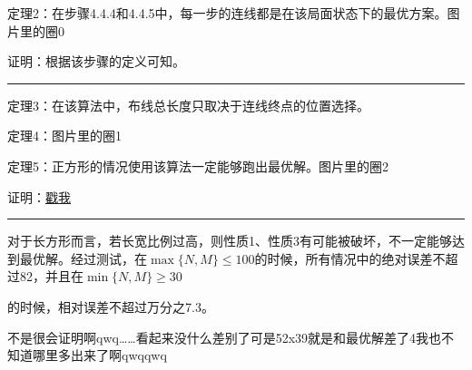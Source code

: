\documentclass[]{article}
\begin{document}
定理2：在步骤4.4.4和4.4.5中，每一步的连线都是在该局面状态下的最优方案。图片里的圈0

证明：根据该步骤的定义可知。

\begin{center}\rule{0.5\linewidth}{\linethickness}\end{center}

定理3：在该算法中，布线总长度只取决于连线终点的位置选择。

定理4：图片里的圈1

定理5：正方形的情况使用该算法一定能够跑出最优解。图片里的圈2

证明：\href{proof.jpg}{戳我}

\begin{center}\rule{0.5\linewidth}{\linethickness}\end{center}

对于长方形而言，若长宽比例过高，则性质1、性质3有可能被破坏，不一定能够达到最优解。经过测试，在\(\max \{N,M\}\le 100\)的时候，所有情况中的绝对误差不超过82，并且在\(\min\{N,M\}\ge 30\)

的时候，相对误差不超过万分之7.3。

不是很会证明啊qwq\ldots{}\ldots{}看起来没什么差别了可是52x39就是和最优解差了4我也不知道哪里多出来了啊qwqqwq
\end{document}
